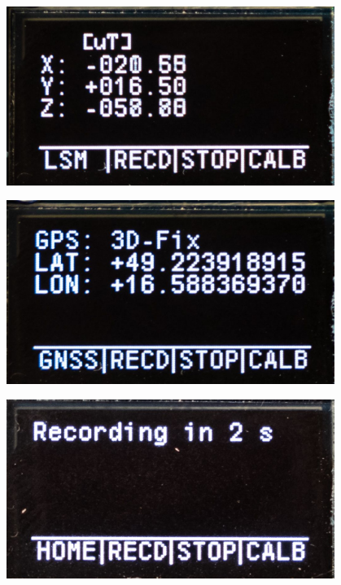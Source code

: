 \documentclass[%
  12pt,       				%
	t,                  %
	aspectratio=1610,   %
	unicode,						%
]{beamer}				    	%
\begin{document}
\begin{frame}
\begin{columns}[T]
\begin{column}{0.25\textwidth}
		\end{column}
		
				\begin{column}{0.25\textwidth}		%
			\begin{figure}%
				\centering
			    \includegraphics[width=1\columnwidth]{obrazky/menuLSM}
			\end{figure}
			\begin{figure}%
				\centering
			    \includegraphics[width=1\columnwidth]{obrazky/menuGPS}
			\end{figure}
			\begin{figure}%
				\centering
			    \includegraphics[width=1\columnwidth]{obrazky/menuREC1}
			\end{figure}
			\end{column}

	\end{columns}											%
\end{frame}
\end{document}

